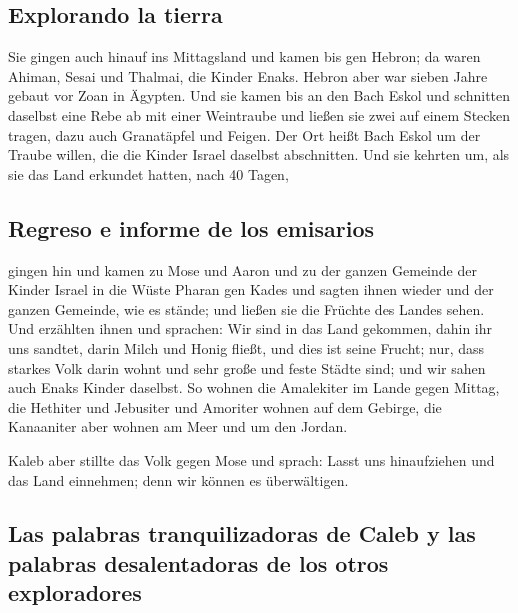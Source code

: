 \hypertarget{explorando-la-tierra}{%
\subsection{Explorando la tierra}\label{explorando-la-tierra}}

 Sie gingen auch hinauf ins Mittagsland und kamen bis gen
Hebron; da waren Ahiman, Sesai und Thalmai, die Kinder Enaks. Hebron
aber war sieben Jahre gebaut vor Zoan in Ägypten.  Und
sie kamen bis an den Bach Eskol und schnitten daselbst eine Rebe ab mit
einer Weintraube und ließen sie zwei auf einem Stecken tragen, dazu auch
Granatäpfel und Feigen.  Der Ort heißt Bach Eskol um der
Traube willen, die die Kinder Israel daselbst abschnitten.
 Und sie kehrten um, als sie das Land erkundet hatten,
nach 40 Tagen,

\hypertarget{regreso-e-informe-de-los-emisarios}{%
\subsection{Regreso e informe de los
emisarios}\label{regreso-e-informe-de-los-emisarios}}

 gingen hin und kamen zu Mose und Aaron und zu der ganzen
Gemeinde der Kinder Israel in die Wüste Pharan gen Kades und sagten
ihnen wieder und der ganzen Gemeinde, wie es stände; und ließen sie die
Früchte des Landes sehen.  Und erzählten ihnen und
sprachen: Wir sind in das Land gekommen, dahin ihr uns sandtet, darin
Milch und Honig fließt, und dies ist seine Frucht;  nur,
dass starkes Volk darin wohnt und sehr große und feste Städte sind; und
wir sahen auch Enaks Kinder daselbst.  So wohnen die
Amalekiter im Lande gegen Mittag, die Hethiter und Jebusiter und
Amoriter wohnen auf dem Gebirge, die Kanaaniter aber wohnen am Meer und
um den Jordan.

 Kaleb aber stillte das Volk gegen Mose und sprach: Lasst
uns hinaufziehen und das Land einnehmen; denn wir können es
überwältigen.

\hypertarget{las-palabras-tranquilizadoras-de-caleb-y-las-palabras-desalentadoras-de-los-otros-exploradores}{%
\subsection{Las palabras tranquilizadoras de Caleb y las palabras
desalentadoras de los otros
exploradores}\label{las-palabras-tranquilizadoras-de-caleb-y-las-palabras-desalentadoras-de-los-otros-exploradores}}

